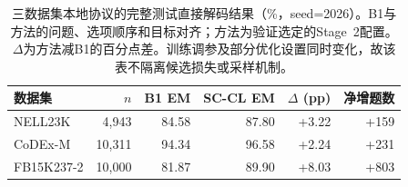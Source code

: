 \begin{table}[htbp]
\caption{三数据集本地协议的完整测试直接解码结果（\%，seed=2026）。B1与方法的问题、选项顺序和目标对齐；方法为验证选定的Stage~2配置。$\Delta$为方法减B1的百分点差。训练调参及部分优化设置同时变化，故该表不隔离候选损失或采样机制。}
\label{tab:latest-direct}
\centering\small
\begin{tabular}{lrrrrr}
\toprule
数据集 & $n$ & B1 EM & SC-CL EM & $\Delta$ (pp) & 净增题数 \\
\midrule
NELL23K & 4,943 & 84.58 & 87.80 & +3.22 & +159 \\
CoDEx-M & 10,311 & 94.34 & 96.58 & +2.24 & +231 \\
FB15K237-2 & 10,000 & 81.87 & 89.90 & +8.03 & +803 \\
\bottomrule
\end{tabular}
\end{table}
